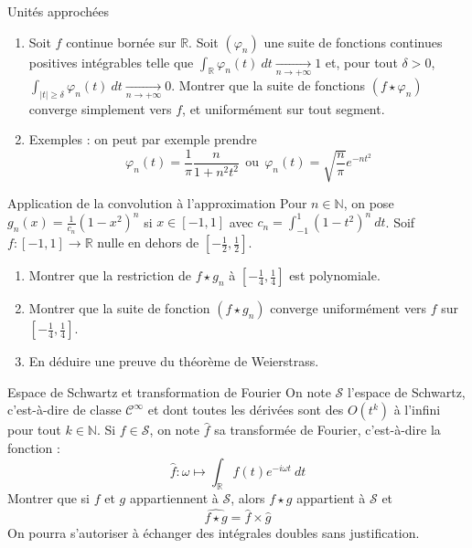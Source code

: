 \documentclass[french,a4paper]{article}
\newcommand{\N}{\mathbb{N}}
\newcommand{\R}{\mathbb{R}}
\theoremstyle{plain}
\theoremstyle{definition}
\theoremstyle{remark}
\begin{document}
\begin{ex}[Châteaux]{Unités approchées}
	\begin{enumerate}
		\item Soit $f$ continue bornée sur $\R$. Soit $(\varphi_n)$ une suite de fonctions continues positives intégrables telle que $\displaystyle\int_\R\varphi_n(t)\ dt\xrightarrow[n\to+\infty]{}1$ et, pour tout $\delta>0$, $\displaystyle\int_{\lvert t\rvert\geqslant \delta}\varphi_n(t)\ dt\xrightarrow[n\to+\infty]{}0$. Montrer que la suite de fonctions $(f\star\varphi_n)$ converge simplement vers $f$, et uniformément sur tout segment.
		\item Exemples : on peut par exemple prendre $$\varphi_n(t)=\frac{1}{\pi}\frac{n}{1+n^2t^2}\ \ \text{ou}\ \ \varphi_n(t)=\sqrt{\frac{n}{\pi}}e^{-nt^2}$$
	\end{enumerate}
\end{ex}

\begin{ex}[Châteaux]{Application de la convolution à l'approximation}
	Pour $n\in\N$, on pose $\displaystyle g_n(x)=\frac{1}{c_n}(1-x^2)^n$ si $x\in[-1,1]$ avec $c_n=\displaystyle\int_{-1}^{1}(1-t^2)^n\ dt$. Soif $f:[-1,1]\to\R$ nulle en dehors de $\displaystyle\left[-\frac{1}{2},\frac{1}{2}\right]$. 
	\begin{enumerate}
		\item Montrer que la restriction de $f\star g_n$ à $\displaystyle\left[-\frac{1}{4},\frac{1}{4}\right]$ est polynomiale.
		\item Montrer que la suite de fonction $(f\star g_n)$ converge uniformément vers $f$ sur $\displaystyle\left[-\frac{1}{4},\frac{1}{4}\right]$.
		\item En déduire une preuve du théorème de Weierstrass.
	\end{enumerate}
\end{ex}

\begin{ex}[Châteaux]{Espace de Schwartz et transformation de Fourier}
	On note $\mathcal{S}$ l'espace de Schwartz, c'est-à-dire de classe $\mathcal{C}^\infty$ et dont toutes les dérivées sont des $O(t^k)$ à l'infini pour tout $k\in\N$. Si $f\in\mathcal{S}$, on note $\widehat{f}$ sa transformée de Fourier, c'est-à-dire la fonction : $$\widehat{f}:\omega\mapsto\int_\R f(t)e^{-i\omega t}\ dt$$ Montrer que si $f$ et $g$ appartiennent à $\mathcal{S}$, alors $f\star g$ appartient à $\mathcal{S}$ et $$\widehat{f\star g}=\widehat{f}\times\widehat{g}$$ On pourra s'autoriser à échanger des intégrales doubles sans justification.
\end{ex}
\end{document}
